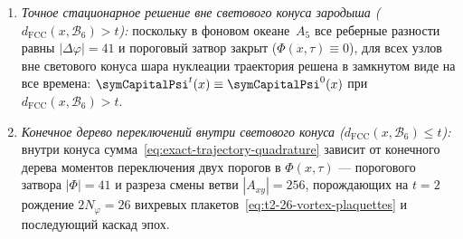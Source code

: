 \begin{enumerate}[label=\textbf{Z\arabic*.},leftmargin=*]
\begin{enumerate}[label=(\alph*),nosep]
    \begin{equation}
    \label{eq:exact-trajectory-quadrature}
      \varphi_c(x,t)
      \;=\;
      \left(\varphi_c(x,0) + \sum_{\tau=0}^{t-1} (t-\tau)\,\Phi(x,\tau)\right) \bmod 512.
    \end{equation}
    Если на интервале $0\le\tau\le t-1$ ворота постоянны ($\Phi(x,\tau)\equiv\Phi_0(x)$), вынесение $\Phi_0(x)$ за знак суммы оставляет сумму первых $t$ натуральных чисел $t + (t-1) + \dots + 2 + 1 = \frac{t(t+1)}{2}$, сворачивая траекторию в параболу на циферблате~$\mathbb{Z}_{512}$:
    \begin{equation}
    \label{eq:stationary-gate-parabola}
      \varphi_c(x,t)
      \;=\;
      \left(\varphi_c(x,0) + \frac{t(t+1)}{2}\,\Phi_0(x)\right) \bmod 512.
    \end{equation}
    При нечётном $\Phi_0$ ($\gcd(\Phi_0,512)=1$) условие возвращения фазы к начальному значению $\varphi_c(x,t)\equiv\varphi_c(x,0)\pmod{512}$ равносильно делимости
    \[
      512 \;\Big|\; \frac{t(t+1)}{2}
      \quad\Longleftrightarrow\quad
      1024 = 2^{10} \;\Big|\; t(t+1).
    \]
    Так как соседние целые числа $t$ и $t+1$ взаимно просты (одно из них нечётно и не имеет общих делителей с~$2^{10}$), произведение $t(t+1)$ делится на $1024$ тогда и только тогда, когда либо $1024\mid t$, либо $1024\mid(t+1)$.
    Поэтому первое положительное возвращение самой фазы к $\varphi_c(x,0)$ наступает при $t+1 = 1024$, то есть на такте $t = 2\phaseRingCount - 1 = 1023$
    (при этом на следующем такте $t = 1024$ делится уже первый множитель~$t$, так что $\varphi_c(x,1023) = \varphi_c(x,1024) = \varphi_c(x,0)$, и полное состояние второго порядка $\bigl(\varphi_c(x,t),\varphi_c(x,t-1)\bigr)$ впервые возвращается в исходную точку покоя $(\varphi_0,\varphi_0)$ ровно через период $2\phaseRingCount = 1024$ такта --- удвоенное спинорное накрытие $720^\circ$).
  \item \emph{Точное стационарное решение вне светового конуса зародыша ($d_{\mathrm{FCC}}(x,\mathcal{B}_6) > t$):}
    поскольку в фоновом океане~$A_5$ все реберные разности равны $|\Delta\varphi|=41$ и пороговый затвор закрыт ($\Phi(x,\tau)\equiv 0$), для всех узлов вне светового конуса шара нуклеации траектория решена в замкнутом виде на все времена: $\symCapitalPsi^t(x) \equiv \symCapitalPsi^0(x)$ при $d_{\mathrm{FCC}}(x,\mathcal{B}_6) > t$.
  \item \emph{Конечное дерево переключений внутри светового конуса ($d_{\mathrm{FCC}}(x,\mathcal{B}_6) \le t$):}
    внутри конуса сумма~\eqref{eq:exact-trajectory-quadrature} зависит от конечного дерева моментов переключения двух порогов в $\Phi(x,\tau)$ --- порогового затвора $|\Phi|=41$ и разреза смены ветви $|A_{xy}|=256$, порождающих на $t=2$ рождение $2N_\varphi=26$ вихревых плакетов~\eqref{eq:t2-26-vortex-plaquettes} и последующий каскад эпох.
  \end{enumerate}
\end{enumerate}

